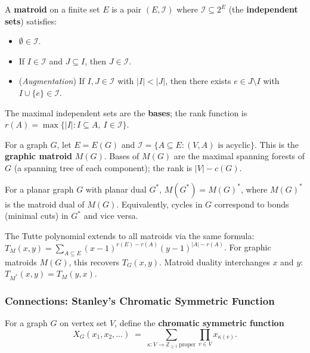 \begin{definition}[Matroid]\label{def:matroid}
A \textbf{matroid} on a finite set $E$ is a pair $(E, \mathcal I)$
where $\mathcal I \subseteq 2^E$ (the \textbf{independent sets})
satisfies:
\begin{itemize}
  \item $\emptyset \in \mathcal I$.
  \item If $I \in \mathcal I$ and $J \subseteq I$, then $J \in \mathcal I$.
  \item (\emph{Augmentation}) If $I, J \in \mathcal I$ with $|I| < |J|$,
        then there exists $e \in J \setminus I$ with $I \cup \{e\} \in \mathcal I$.
\end{itemize}
The maximal independent sets are the \textbf{bases}; the rank
function is $r(A) = \max\{|I| : I \subseteq A,\ I \in \mathcal I\}$.
\end{definition}

\begin{example}
For a graph $G$, let $E = E(G)$ and
$\mathcal I = \{A \subseteq E : (V, A) \text{ is acyclic}\}$. This is
the \textbf{graphic matroid} $M(G)$. Bases of $M(G)$ are the maximal
spanning forests of $G$ (a spanning tree of each component); the rank
is $|V| - c(G)$.
\end{example}

\begin{theorem}
For a planar graph $G$ with planar dual $G^*$,
$M(G^*) = M(G)^*$, where $M(G)^*$ is the matroid dual of $M(G)$.
Equivalently, cycles in $G$ correspond to bonds (minimal cuts) in
$G^*$ and vice versa.
\end{theorem}

\begin{theorem}
The Tutte polynomial extends to all matroids via the same formula:
$T_M(x, y) = \sum_{A \subseteq E} (x - 1)^{r(E) - r(A)} (y - 1)^{|A| - r(A)}$.
For graphic matroids $M(G)$, this recovers $T_G(x, y)$. Matroid
duality interchanges $x$ and $y$:
$T_{M^*}(x, y) = T_M(y, x)$.
\end{theorem}

\subsubsection{Connections: Stanley's Chromatic Symmetric Function}

\begin{definition}
For a graph $G$ on vertex set $V$, define the \textbf{chromatic
symmetric function}
\[
  X_G(x_1, x_2, \ldots) \;=\; \sum_{\kappa : V \to \mathbb Z_{\ge 1}\ \text{proper}}
                              \prod_{v \in V} x_{\kappa(v)}.
\]
\end{definition}


